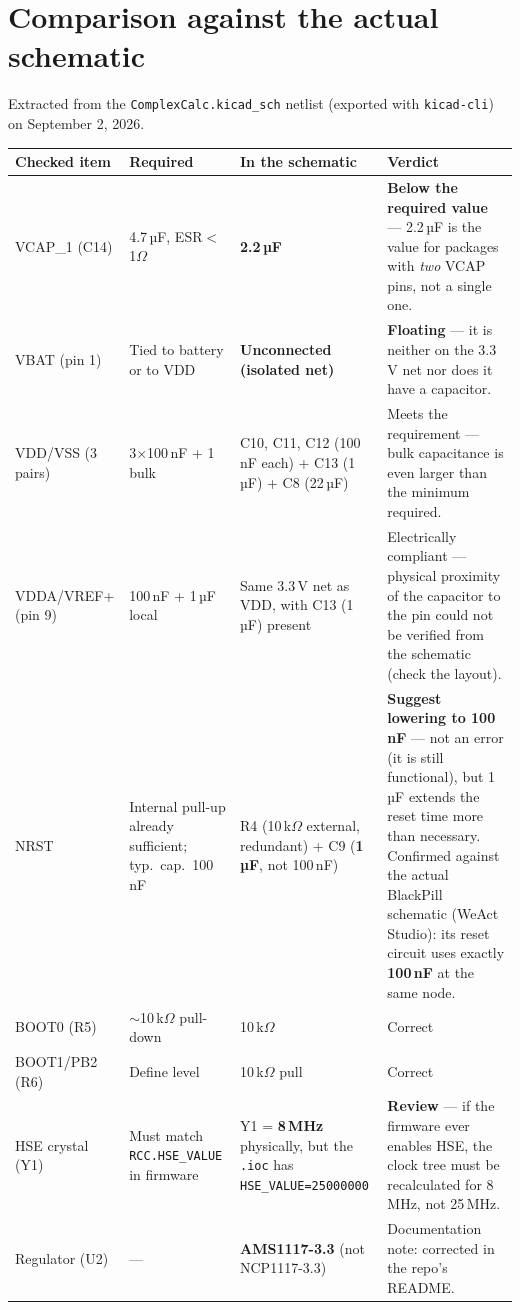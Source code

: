 \documentclass[11pt]{article}
\begin{document}
\clearpage
\section{Comparison against the actual schematic}

Extracted from the \texttt{ComplexCalc.kicad\_sch} netlist (exported with
\texttt{kicad-cli}) on September 2, 2026.

\begin{longtable}{p{3.5cm}p{3.2cm}p{3.2cm}p{4cm}}
\toprule
\textbf{Checked item} & \textbf{Required} & \textbf{In the schematic} & \textbf{Verdict} \\
\midrule
\endhead
VCAP\_1 (C14) & 4.7\,µF, ESR$<$1$\Omega$ & \textbf{2.2\,µF} &
  \textcolor{warnred}{\textbf{Below the required value}} --- 2.2\,µF is
  the value for packages with \emph{two} VCAP pins, not a single one. \\
VBAT (pin 1) & Tied to battery or to VDD & \textbf{Unconnected (isolated
  net)} & \textcolor{warnred}{\textbf{Floating}} --- it is neither on the
  3.3\,V net nor does it have a capacitor. \\
VDD/VSS (3 pairs) & 3$\times$100\,nF + 1 bulk & C10, C11, C12 (100\,nF
  each) + C13 (1\,µF) + C8 (22\,µF) &
  \textcolor{okgreen}{Meets the requirement} --- bulk capacitance is even
  larger than the minimum required. \\
VDDA/VREF+ (pin 9) & 100\,nF + 1\,µF local & Same 3.3\,V net as VDD, with
  C13 (1\,µF) present & \textcolor{okgreen}{Electrically compliant} ---
  physical proximity of the capacitor to the pin could not be verified
  from the schematic (check the layout). \\
NRST & Internal pull-up already sufficient; typ.\ cap.\ 100\,nF & R4
  (10\,k$\Omega$ external, redundant) + C9 (\textbf{1\,µF}, not 100\,nF) &
  \textcolor{sugamber}{\textbf{Suggest lowering to 100\,nF}} --- not an
  error (it is still functional), but 1\,µF extends the reset time more
  than necessary. Confirmed against the actual BlackPill schematic (WeAct
  Studio): its reset circuit uses exactly \textbf{100\,nF} at the same
  node. \\
BOOT0 (R5) & $\sim$10\,k$\Omega$ pull-down & 10\,k$\Omega$ &
  \textcolor{okgreen}{Correct} \\
BOOT1/PB2 (R6) & Define level & 10\,k$\Omega$ pull &
  \textcolor{okgreen}{Correct} \\
HSE crystal (Y1) & Must match \texttt{RCC.HSE\_VALUE} in firmware &
  Y1 = \textbf{8\,MHz} physically, but the \texttt{.ioc} has
  \texttt{HSE\_VALUE=25000000} & \textcolor{warnred}{\textbf{Review}} ---
  if the firmware ever enables HSE, the clock tree must be recalculated
  for 8\,MHz, not 25\,MHz. \\
Regulator (U2) & --- & \textbf{AMS1117-3.3} (not NCP1117-3.3) &
  Documentation note: corrected in the repo's README. \\
\bottomrule
\end{longtable}
\end{document}

